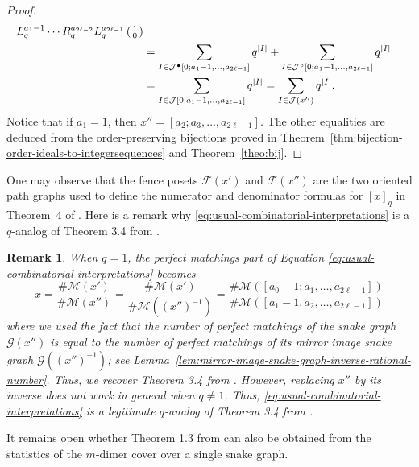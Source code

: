 \documentclass[a4paper,12pt]{amsart}
\newtheorem{remark}[definition]{Remark}
\newcommand{\xx}{{x}}
\newcommand{\Fcal}{{\mathcal{F}}}
\newcommand{\Gcal}{{\mathcal{G}}}
\newcommand{\Jcal}{{\mathcal{J}}}
\newcommand{\Mcal}{{\mathcal{M}}}
\newcommand{\0}{\mathtt{0}}
\newcommand{\1}{\mathtt{1}}
\newcommand{\2}{\mathtt{2}}
\newcommand{\3}{\mathtt{3}}
\newcommand{\size}[1]{
    {|#1|}                 %
}
\begin{document}
\begin{proof}
\begin{align*}
        L_q^{a_1-1}\cdots R_q^{a_{2\ell-2}}L_q^{a_{2\ell-1}}
        \left(\begin{smallmatrix} 1 \\ 0 \end{smallmatrix}\right)\\
        &=
          \sum_{I\in \Jcal^\bullet[0;a_1-1,\dots,a_{2\ell-1}]} q^{\size{I}}
        + \sum_{I\in \Jcal^\circ  [0;a_1-1,\dots,a_{2\ell-1}]} q^{\size{I}}\\
        &=
        \sum_{I\in \Jcal[0;a_1-1,\dots,a_{2\ell-1}]} q^{\size{I}}
        = \sum_{I\in \Jcal(\xx'')} q^{\size{I}}.
    \end{align*}
    \endgroup
    Notice that if $a_1=1$, then $\xx''=[a_2;a_3,\dots,a_{2\ell-1}]$.
    The other equalities are deduced from the order-preserving bijections
    proved in Theorem~\ref{thm:bijection-order-ideals-to-integersequences}
    and Theorem~\ref{theo:bij}.
\end{proof}

One may observe that the fence posets $\Fcal(\xx')$ and $\Fcal(\xx'')$ are
the two oriented path graphs used to define the numerator and denominator
formulas for $[\xx]_q$ in Theorem~4 of  \cite{MR4073883}.
Here is a remark why \eqref{eq:usual-combinatorial-interpretations}
is a $q$-analog of Theorem 3.4 from \cite{MR3778183}.

\begin{remark}\label{rem:relation-to-Thm-3.4-Schiffler}
    When $q=1$, the perfect matchings part of Equation
    \eqref{eq:usual-combinatorial-interpretations} becomes
    \[
    \xx
    = \frac{\#\Mcal(\xx')}
           {\#\Mcal(\xx'')}
    = \frac{\#\Mcal(\xx')}
           {\#\Mcal((\xx'')^{-1})}
    = \frac{\#\Mcal([a_0-1;a_1,\dots,a_{2\ell-1}])}
           {\#\Mcal([a_1-1,a_2,\dots,a_{2\ell-1}])}
    \]
    where we used the fact that the number of perfect matchings
    of the snake graph $\Gcal(\xx'')$
    is equal to the number of perfect matchings of
    its mirror image snake graph $\Gcal((\xx'')^{-1})$;
    see Lemma~\ref{lem:mirror-image-snake-graph-inverse-rational-number}.
    Thus, we recover Theorem 3.4 from \cite{MR3778183}.
    However, replacing $\xx''$ by its inverse does not work
    in general when $q\neq 1$.
    Thus, \eqref{eq:usual-combinatorial-interpretations}
    is a legitimate $q$-analog of Theorem 3.4 from \cite{MR3778183}.
\end{remark}

It remains open whether Theorem 1.3 from \cite{musiker_higher_2023} can also be
obtained from the statistics of the $m$-dimer cover over a single snake graph.
\end{document}
